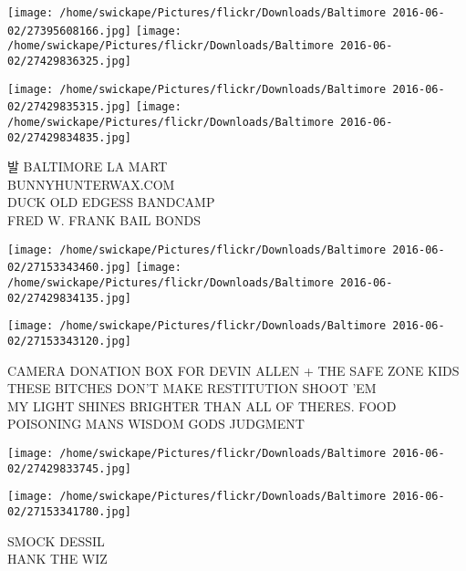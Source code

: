 \documentclass[10pt,letterpaper]{article}
\begin{document}
\texttt{[image: /home/swickape/Pictures/flickr/Downloads/Baltimore 2016-06-02/27395608166.jpg]}
\texttt{[image: /home/swickape/Pictures/flickr/Downloads/Baltimore 2016-06-02/27429836325.jpg]}

\texttt{[image: /home/swickape/Pictures/flickr/Downloads/Baltimore 2016-06-02/27429835315.jpg]}
\texttt{[image: /home/swickape/Pictures/flickr/Downloads/Baltimore 2016-06-02/27429834835.jpg]}

발 BALTIMORE LA MART\\
BUNNYHUNTERWAX.COM\\
DUCK OLD EDGESS BANDCAMP\\
FRED W. FRANK BAIL BONDS\\
\pagebreak

\texttt{[image: /home/swickape/Pictures/flickr/Downloads/Baltimore 2016-06-02/27153343460.jpg]}
\texttt{[image: /home/swickape/Pictures/flickr/Downloads/Baltimore 2016-06-02/27429834135.jpg]}

\texttt{[image: /home/swickape/Pictures/flickr/Downloads/Baltimore 2016-06-02/27153343120.jpg]}

CAMERA DONATION BOX FOR DEVIN ALLEN + THE SAFE ZONE KIDS\\
THESE BITCHES DON'T MAKE RESTITUTION SHOOT 'EM\\
MY LIGHT SHINES BRIGHTER THAN ALL OF THERES.  FOOD POISONING MANS WISDOM GODS JUDGMENT\\
\pagebreak

\texttt{[image: /home/swickape/Pictures/flickr/Downloads/Baltimore 2016-06-02/27429833745.jpg]}

\vspace{0.25in}
\texttt{[image: /home/swickape/Pictures/flickr/Downloads/Baltimore 2016-06-02/27153341780.jpg]}

SMOCK DESSIL\\
HANK THE WIZ\\
\pagebreak
\end{document}
